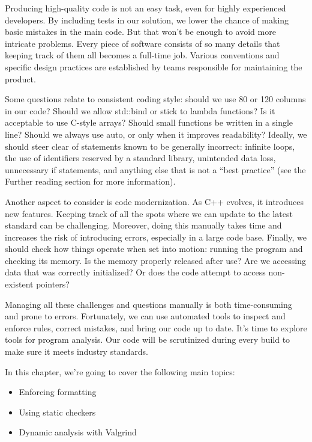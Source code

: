 Producing high-quality code is not an easy task, even for highly experienced developers. By including tests in our solution, we lower the chance of making basic mistakes in the main code. But that won’t be enough to avoid more intricate problems. Every piece of software consists of so many details that keeping track of them all becomes a full-time job. Various conventions and specific design practices are established by teams responsible for maintaining the product.

Some questions relate to consistent coding style: should we use 80 or 120 columns in our code? Should we allow std::bind or stick to lambda functions? Is it acceptable to use C-style arrays? Should small functions be written in a single line? Should we always use auto, or only when it improves readability? Ideally, we should steer clear of statements known to be generally incorrect: infinite loops, the use of identifiers reserved by a standard library, unintended data loss, unnecessary if statements, and anything else that is not a “best practice” (see the Further reading section for more information).

Another aspect to consider is code modernization. As C++ evolves, it introduces new features. Keeping track of all the spots where we can update to the latest standard can be challenging. Moreover, doing this manually takes time and increases the risk of introducing errors, especially in a large code base. Finally, we should check how things operate when set into motion: running the program and checking its memory. Is the memory properly released after use? Are we accessing data that was correctly initialized? Or does the code attempt to access non-existent pointers?

Managing all these challenges and questions manually is both time-consuming and prone to errors. Fortunately, we can use automated tools to inspect and enforce rules, correct mistakes, and bring our code up to date. It’s time to explore tools for program analysis. Our code will be scrutinized during every build to make sure it meets industry standards.

In this chapter, we’re going to cover the following main topics:

\begin{itemize}
\item
Enforcing formatting

\item
Using static checkers

\item
Dynamic analysis with Valgrind
\end{itemize}